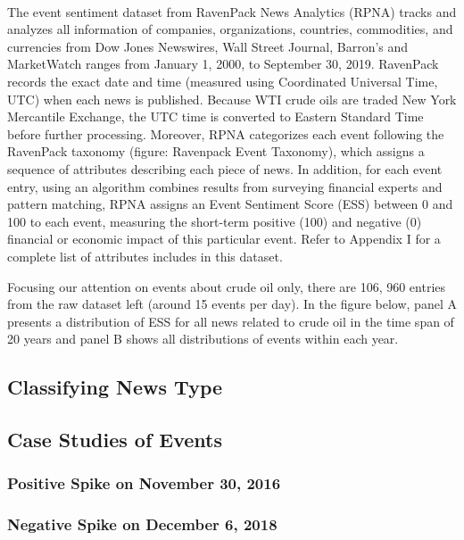 \documentclass[12pt]{article}
\begin{document}
	\paragraph{} The event sentiment dataset from RavenPack News Analytics (RPNA) tracks and analyzes all information of companies, organizations, countries, commodities, and currencies from Dow Jones Newswires, Wall Street Journal, Barron’s and MarketWatch ranges from January 1, 2000, to September 30, 2019. RavenPack records the exact date and time (measured using Coordinated Universal Time, UTC)  when each news is published. Because WTI crude oils are traded New York Mercantile Exchange, the UTC time is converted to Eastern Standard Time before further processing. Moreover, RPNA categorizes each event following the RavenPack taxonomy (figure: Ravenpack Event Taxonomy), which assigns a sequence of attributes describing each piece of news. In addition, for each event entry, using an algorithm combines results from surveying financial experts and pattern matching, RPNA assigns an Event Sentiment Score (ESS) between 0 and 100 to each event, measuring the short-term positive (100) and negative (0) financial or economic impact of this particular event. Refer to Appendix I for a complete list of attributes includes in this dataset.

	\par Focusing our attention on events about crude oil only, there are 106, 960 entries from the raw dataset left (around 15 events per day). In the figure below, panel A presents a distribution of ESS for all news related to crude oil in the time span of 20 years and panel B shows all distributions of events within each year.


	\subsection{Classifying News Type}
	
	\subsection{Case Studies of Events}
	\subsubsection{Positive Spike on November 30, 2016}
	
	\subsubsection{Negative Spike on December 6, 2018}
	
\end{document}
